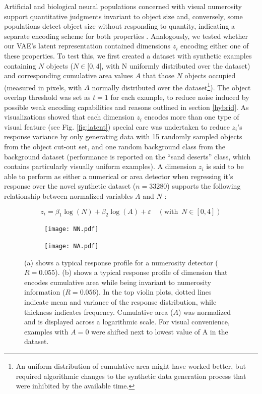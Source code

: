 \documentclass[twocolumn]{article}
\begin{document}
Artificial and biological neural populations concerned with visual
numerosity support quantitative judgments invariant to object size and,
conversely, some populations detect object size without responding to
quantity, indicating a separate encoding scheme for both properties
\citep{stoianov2012, harvey2013topographic}. Analogously, we tested
whether our VAE's latent representation contained dimensions \(z_i\)
encoding either one of these properties. To test this, we first created
a dataset with synthetic examples containing \(N\) objects
(\(N \in \lbrack 0, 4\rbrack\), with N uniformly distributed over the
dataset) and corresponding cumulative area values \(A\) that those \(N\)
objects occupied (measured in pixels, with \(A\) normally distributed
over the dataset\footnote{An uniform distribution of cumulative area
  might have worked better, but required algorithmic changes to the
  synthetic data generation process that were inhibited by the available time.}). The object overlap threshold was set as $t=1$ for
each example, to reduce noise induced by possible weak encoding
capabilities and reasons outlined in section
\ref{hybrid}. As visualizations showed that each dimension \(z_i\) encodes more
than one type of visual feature (see Fig. \ref{fig:latent}) special care was
undertaken to reduce \(z_i\)'s response variance by only generating data
with 15 randomly sampled objects from the object cut-out set, and one
random background class from the background dataset (performance is
reported on the ``sand deserts'' class, which contains particularly
visually uniform examples). A dimension \(z_i\) is said to be able to
perform as either a numerical or area detector when regressing it's
response over the novel synthetic dataset (\(n=33280\)) supports the
following relationship between normalized variables \(A\) and \(N\)
\citep{stoianov2012}:

\[z_i = \beta_1 \log(N) + \beta_2\log(A) + \varepsilon \quad (\textrm{with }\, N \in [0, 4]) \tag{2} \]

\begin{figure}[ht]
\centering
\begin{subfigure}{.5\textwidth}
  \centering
  \texttt{[image: NN.pdf]}
  \caption{}
  \label{fig:zn}
\end{subfigure}%
\begin{subfigure}{.5\textwidth}
  \centering
  \texttt{[image: NA.pdf]}
   \caption{}
  \label{fig:za}
\end{subfigure}
\caption{(a) shows a typical response profile for a numerosity detector ($R=0.055$).  (b) shows a typical response profile of dimension that encodes cumulative area while being invariant to numerosity information ($R=0.056$). In the top violin plots, dotted lines indicate mean and variance of the response distribution, while thickness indicates frequency. Cumulative area ($A$) was normalized and is displayed across a logarithmic scale. For visual convenience, examples with $A=0$ were shifted next to lowest value of A in the dataset.}
\label{fig:linear}
\end{figure}
\end{document}
